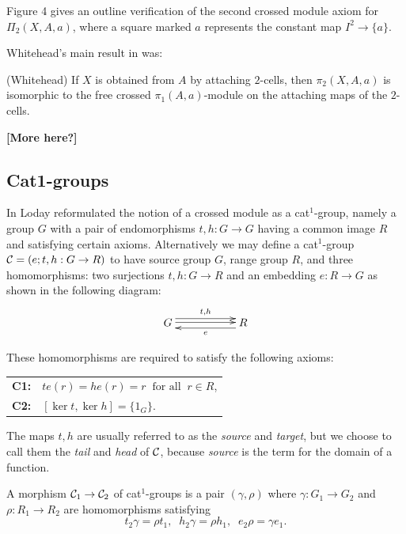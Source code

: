 Figure 4 gives an outline verification of the second crossed module axiom
for $\Pi_2(X,A,a)$, where a square marked $a$ represents the constant 
map  $I^2 \to \{a\}$.

Whitehead's main result in \cite{W-41,W-46,W-49a} was:
\begin{thm} {\rm (Whitehead)} \label{thm:W} 
If  $X$  is obtained from  $A$  by attaching $2$-cells, 
then  $\pi_2(X,A,a)$  is isomorphic to the free crossed
$\pi_1(A,a)$-module on the attaching maps of the $2$-cells.
\end{thm}

\noindent
{\bf [More here?]}





\subsection{Cat1-groups} \label{subs:cat1}  

In \cite{loday1} Loday reformulated the notion of a 
crossed module as a cat$^1$-group, 
namely a group $G$ with a pair of endomorphisms $t,h : G \to G$
having a common image $R$ and satisfying certain axioms.
Alternatively we may define a cat$^1$-group 
$\mathcal{C} = (e;t,h : G \to R )$  to have source group $G$,
range group $R$, and three homomorphisms:  
two surjections  $t,h : G \to R$  
and an embedding  $e : R \to G$ 
as shown in the following diagram:
$$
\xymatrix{
 G  \ar[rr] <1.0ex>^{t,h} \ar[rr] <0.2ex>
   &&  R \ar[ll] <1.0ex>^e \\
}
$$

\noindent
These homomorphisms are required to satisfy the following axioms:
\begin{center}
\begin{tabular}{r l}
\textbf{C1:}  &  $te(r) = he(r) = r \;\; \mbox{for all}\;\; r \in R$, \\
\textbf{C2:}  &  $[\ker t, \ker h] = \{ 1_G \}$.
\end{tabular}
\end{center}
The maps  $t,h$  are usually referred to as the 
  
\emph{source} and \emph{target}, but we choose to call them the 
\emph{tail} and \emph{head} of  $\mathcal{C}$, 
because \emph{source} is the {\GAP} term for the domain of a function.

A morphism  $\mathcal{C}_1 \to \mathcal{C}_2$  
of cat$^1$-groups is a pair  $(\gamma, \rho)$  where
$\gamma : G_1 \to G_2$  and  $\rho : R_1 \to R_2$  
are homomorphisms satisfying
\begin{equation} \label{eq:cat1mor}
t_2 \gamma = \rho t_1, \;\; 
h_2 \gamma = \rho h_1, \;\; 
e_2 \rho = \gamma e_1.
\end{equation}

